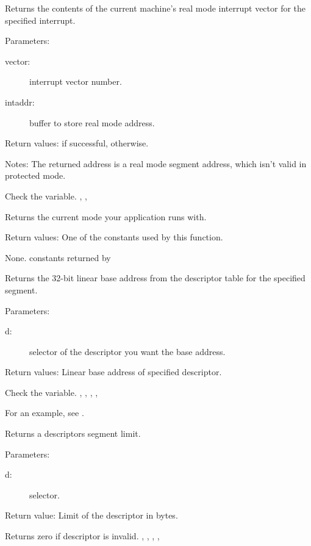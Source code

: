 {Returns the contents of the current machine's real mode interrupt vector for
the specified interrupt.

Parameters:
\begin{description}
\item[vector:\ ] interrupt vector number. 
\item[intaddr:\ ] buffer to store real mode  address.
\end{description}

Return values:  if successful,  otherwise.

Notes: The returned address is a real mode segment address, which isn't
valid in protected mode.
}
{ Check the  variable.}
{ , 
, 
 }

{Returns the current mode your application runs with.

Return values: One of the constants used by this function.
}
{None. }
{ constants returned by   }

\html{}

{ Returns the 32-bit linear base address from the descriptor table for the
specified segment.

Parameters: 
\begin{description}
\item[d:\ ] selector of the descriptor you want the base address.
\end{description}

Return values: Linear base address of specified descriptor.
}
{ Check the  variable.}
{
,
, 
,
,
}

For an example, see 
.

{Returns a descriptors segment limit.

Parameters:
\begin{description}
\item [d:\ ] selector.
\end{description}

Return value: Limit of the descriptor in bytes.
}{ Returns zero if descriptor is invalid. }
{,
, 
,
, 
}



